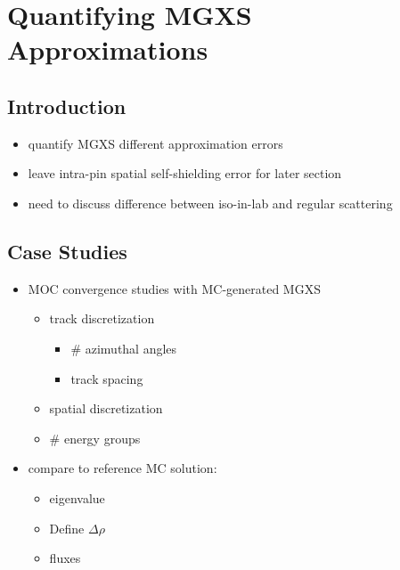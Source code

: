 \chapter{Quantifying MGXS Approximations}
\label{chap:biases}

\section{Introduction}
\label{sec:chap4-intro}

\begin{itemize}[noitemsep]
  \item quantify \ac{MGXS} different approximation errors
  \item leave intra-pin spatial self-shielding error for later section
  \item need to discuss difference between iso-in-lab and regular scattering
\end{itemize}


\section{Case Studies}
\label{sec:chap4-case-studies}

\begin{itemize}[noitemsep]
  \item \ac{MOC} convergence studies with \ac{MC}-generated \ac{MGXS}
  \begin{itemize}[noitemsep]
    \item track discretization
    \begin{itemize}[noitemsep]
      \item \# azimuthal angles
      \item track spacing
    \end{itemize}
    \item spatial discretization
    \item \# energy groups  
  \end{itemize}
  \item compare to reference \ac{MC} solution:
  \begin{itemize}
    \item eigenvalue
	\item Define $\Delta\rho$
    \item fluxes
  \end{itemize}
\end{itemize}

